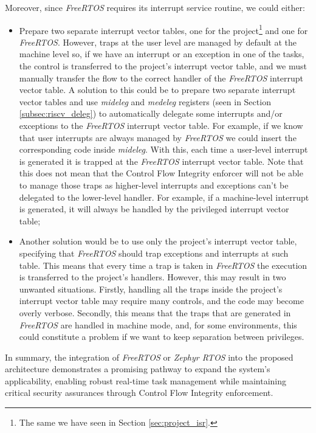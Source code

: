 Moreover, since \textit{FreeRTOS} requires its interrupt service routine, we
could either:
\begin{itemize}
  \item Prepare two separate interrupt vector tables, one for the project\footnote{The
    same we have seen in Section \ref{sec:project_isr}.} and one for \textit{FreeRTOS}.
    However, traps at the user level are managed by default at the machine level
    so, if we have an interrupt or an exception in one of the tasks, the control
    is transferred to the project's interrupt vector table, and we must manually
    transfer the flow to the correct handler of the \textit{FreeRTOS} interrupt
    vector table. A solution to this could be to prepare two separate interrupt vector
    tables and use \textit{mideleg} and \textit{medeleg} registers (seen in
    Section \ref{subsec:riscv_deleg}) to automatically delegate some interrupts and/or
    exceptions to the \textit{FreeRTOS} interrupt vector table. For example, if
    we know that user interrupts are always managed by \textit{FreeRTOS} we could
    insert the corresponding code inside \textit{mideleg}. With this, each time
    a user-level interrupt is generated it is trapped at the \textit{FreeRTOS} interrupt
    vector table. Note that this does not mean that the Control Flow Integrity
    enforcer will not be able to manage those traps as higher-level interrupts
    and exceptions can't be delegated to the lower-level handler. For example,
    if a machine-level interrupt is generated, it will always be handled by the privileged
    interrupt vector table;

  \item Another solution would be to use only the project's interrupt vector table,
    specifying that \textit{FreeRTOS} should trap exceptions and interrupts at such
    table. This means that every time a trap is taken in \textit{FreeRTOS} the execution
    is transferred to the project's handlers. However, this may result in two unwanted
    situations. Firstly, handling all the traps inside the project's interrupt vector
    table may require many controls, and the code may become overly verbose. Secondly,
    this means that the traps that are generated in \textit{FreeRTOS} are handled
    in machine mode, and, for some environments, this could constitute a problem
    if we want to keep separation between privileges.
\end{itemize}

In summary, the integration of \textit{FreeRTOS} or \textit{Zephyr RTOS} into the
proposed architecture demonstrates a promising pathway to expand the system's applicability,
enabling robust real-time task management while maintaining critical security
assurances through Control Flow Integrity enforcement.

